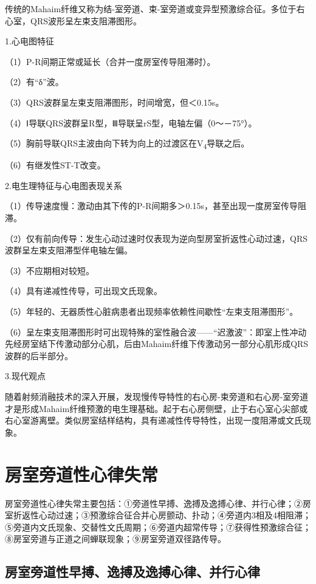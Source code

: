 传统的Mahaim纤维又称为结-室旁道、束-室旁道或变异型预激综合征。多位于右心室，QRS波形呈左束支阻滞图形。

1.心电图特征

（1）P-R间期正常或延长（合并一度房室传导阻滞时）。

（2）有“δ”波。

（3）QRS波群呈左束支阻滞图形，时间增宽，但＜0.15s。

（4）Ⅰ导联QRS波群呈R型，Ⅲ导联呈rS型，电轴左偏（0～－75°）。

（5）胸前导联QRS主波由向下转为向上的过渡区在V\textsubscript{4}导联之后。

（6）有继发性ST-T改变。

2.电生理特征与心电图表现关系

（1）传导速度慢：激动由其下传的P-R间期多＞0.15s，甚至出现一度房室传导阻滞。

（2）仅有前向传导：发生心动过速时仅表现为逆向型房室折返性心动过速，QRS波群呈左束支阻滞型伴电轴左偏。

（3）不应期相对较短。

（4）具有递减性传导，可出现文氏现象。

（5）年轻的、无器质性心脏病患者出现频率依赖性间歇性“左束支阻滞图形”。

（6）呈左束支阻滞图形时可出现特殊的室性融合波------“迟激波”：即室上性冲动先经房室结下传激动部分心肌，后由Mahaim纤维下传激动另一部分心肌形成QRS波群的后半部分。

3.现代观点

随着射频消融技术的深入开展，发现慢传导特性的右心房-束旁道和右心房-室旁道才是形成Mahaim纤维预激的电生理基础。起于右心房侧壁，止于右心室心尖部或右心室游离壁。类似房室结样结构，具有递减性传导特性，出现一度阻滞或文氏现象。

\protect\hypertarget{text00036.htmlux5cux23subid421}{}{}

\section{房室旁道性心律失常}

房室旁道性心律失常主要包括：①旁道性早搏、逸搏及逸搏心律、并行心律；②房室折返性心动过速；③预激综合征合并心房颤动、扑动；④旁道内3相及4相阻滞；⑤旁道内文氏现象、交替性文氏周期；⑥旁道内超常传导；⑦获得性预激综合征；⑧房室旁道与正道之间蝉联现象；⑨房室旁道双径路传导。

\protect\hypertarget{text00036.htmlux5cux23subid422}{}{}

\subsection{房室旁道性早搏、逸搏及逸搏心律、并行心律}

